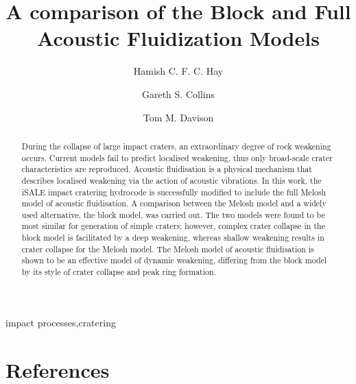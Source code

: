 \documentclass[preprint,3p,twocolumn,times,authoryear]{elsarticle}
\begin{document}
\begin{frontmatter}

\title{A comparison of the Block and Full Acoustic Fluidization Models}

\author[label1]{Hamish C. F. C. Hay}
\author[label2]{Gareth S. Collins}
\author[label2]{Tom M. Davison}
\address[label1]{Lunar and Planetary Laboratory, University of Arizona, Tucson, AZ 85719, United States}
\address[label2]{Impacts and Astromaterials Research Centre, Department of Earth Science and Engineering, Imperial College London, London, SW7 2BP, United Kingdom}

\begin{keyword}
impact processes\sep cratering
\end{keyword}

\begin{abstract}

\noindent During the collapse of large impact craters, an extraordinary degree of rock weakening occurs. Current models fail to predict localised weakening, thus only broad-scale crater characteristics are reproduced. Acoustic fluidisation is a physical mechanism that describes localised weakening via the action of acoustic vibrations. In this work, the iSALE impact cratering hydrocode is successfully modified to include the full Melosh model of acoustic fluidisation. A comparison between the Melosh model and a widely used alternative, the block model, was carried out. The two models were found to be most similar for generation of simple craters; however, complex crater collapse in the block model is facilitated  by a deep weakening, whereas shallow weakening results in crater collapse for the Melosh model. The Melosh model of acoustic fluidisation is shown to be an effective model of dynamic weakening, differing from the block model by its style of crater collapse and peak ring formation.

\end{abstract}
\end{frontmatter}











\section*{References}



\end{document}
